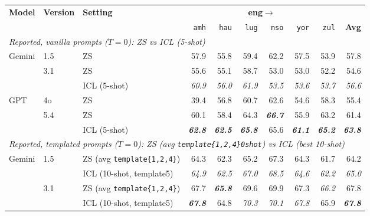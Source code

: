 \begin{table}[t]
\centering
\small
\renewcommand{\arraystretch}{1.05}
\begin{tabular}{lllrrrrrrr}
\toprule
\textbf{Model} & \textbf{Version} & \textbf{Setting} & \multicolumn{6}{c}{\textbf{eng$\to$}} & \\
\cmidrule(lr){4-9}
   &    &    & \texttt{amh} & \texttt{hau} & \texttt{lug} & \texttt{nso} & \texttt{yor} & \texttt{zul} & \textbf{Avg} \\
\midrule
\multicolumn{10}{l}{\textit{Reported, vanilla prompts ($T{=}0$): ZS vs ICL (5-shot)}} \\
\midrule
\multirow{3}{*}{Gemini} & \multirow{1}{*}{1.5} & ZS & 57.9 & 55.8 & 59.4 & 62.2 & 57.5 & 53.9 & 57.8 \\
\cmidrule(lr){2-10}
 & \multirow{2}{*}{3.1} & ZS & 55.6 & 55.1 & 58.7 & 53.0 & 53.0 & 52.2 & 54.6 \\
 &  & ICL (5-shot) & \emph{60.9} & \emph{56.0} & \emph{61.9} & \emph{53.5} & \emph{53.6} & \emph{53.7} & \emph{56.6} \\
\cmidrule(lr){1-10}
\multirow{3}{*}{GPT} & \multirow{1}{*}{4o} & ZS & 39.4 & 56.8 & 60.7 & 62.6 & 54.6 & 58.3 & 55.4 \\
\cmidrule(lr){2-10}
 & \multirow{2}{*}{5.4} & ZS & 60.1 & 58.4 & 64.3 & \textbf{\emph{66.7}} & 55.9 & 63.2 & 61.4 \\
 &  & ICL (5-shot) & \textbf{\emph{62.8}} & \textbf{\emph{62.5}} & \textbf{\emph{65.8}} & 65.6 & \textbf{\emph{61.1}} & \textbf{\emph{65.2}} & \textbf{\emph{63.8}} \\
\midrule\midrule
\multicolumn{10}{l}{\textit{Reported, templated prompts ($T{=}0$): ZS (avg \texttt{template\{1,2,4\}\textunderscore{}0shot}) vs ICL (best 10-shot)}} \\
\midrule
\multirow{4}{*}{Gemini} & \multirow{2}{*}{1.5} & ZS (avg \texttt{template\{1,2,4\}}) & 64.3 & 62.3 & 65.2 & 67.3 & 64.3 & 61.7 & 64.2 \\
 &  & ICL (10-shot, template5) & \emph{64.9} & \emph{62.5} & \emph{67.0} & \emph{68.5} & \emph{64.6} & \emph{62.2} & \emph{65.0} \\
\cmidrule(lr){2-10}
 & \multirow{2}{*}{3.1} & ZS (avg \texttt{template\{1,2,4\}}) & 67.7 & \textbf{\emph{65.8}} & 69.6 & 69.9 & 67.3 & \emph{66.2} & 67.8 \\
 &  & ICL (10-shot, template5) & \textbf{\emph{67.8}} & 64.8 & \emph{70.3} & \emph{70.1} & \emph{67.8} & 65.9 & \textbf{\emph{67.8}} \\
\cmidrule(lr){1-10}

\end{tabular}
\end{table}
